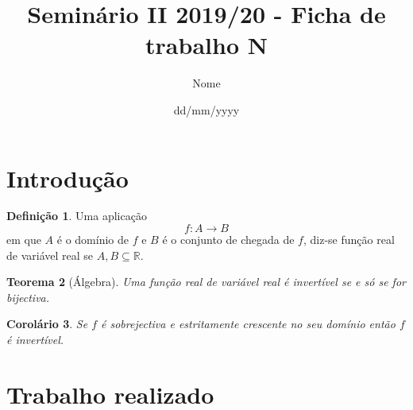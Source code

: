 \documentclass[a4paper]{article}
\title{Seminário II 2019/20 - Ficha de trabalho N }
\author{Nome }
\date{dd/mm/yyyy}
\newcommand{\R}{\mathbb{R}}
\theoremstyle{definition}
\newtheorem{defin}{Definição}
\theoremstyle{plain}
\newtheorem{theorem}[defin]{Teorema}
\newtheorem{corollary}[defin]{Corolário}
\begin{document}
\maketitle


\section{Introdução}



\begin{defin}
Uma aplicação $$f: A \rightarrow B$$ em que $A$ é o domínio de $f$ e $B$ é o conjunto de chegada de $f$, diz-se função real de variável real se $A,B \subseteq \R$. 
\end{defin}

\begin{theorem}[Álgebra]
Uma função real de variável real é invertível se e só se for bijectiva.
\end{theorem}

\begin{corollary}\label{estritcresc}
Se $f$ é sobrejectiva e estritamente crescente no seu dom\'inio então $f$ é invertível. \end{corollary}
\section{Trabalho realizado}
\end{document}
